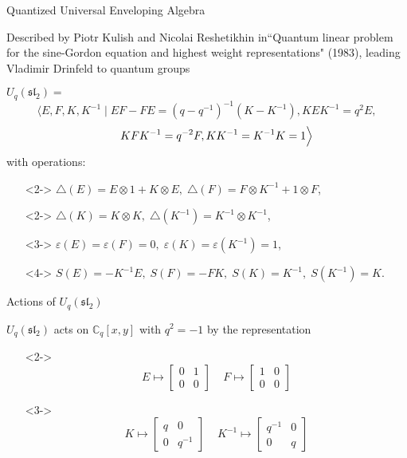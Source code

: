 \documentclass{beamer}
\begin{document}
\begin{frame}{Quantized Universal Enveloping Algebra}

Described by Piotr Kulish and Nicolai Reshetikhin in``Quantum linear problem for the sine-Gordon equation and highest weight representations" (1983), leading Vladimir Drinfeld to quantum groups\newline

$U_q(\mathfrak{sl}
_2)=$
\[
\Big\langle E,F,K,K^{-1}\;\vert\;EF-FE=(q-q^{-1})^{-1}\left(K-K^{-1}\right), KEK^{-1}=q^2 E, \]\[\hspace{4ex}KFK^{-1}=q^{-2}F, KK^{-1}=K^{-1}K=1\Big\rangle
\]
with operations:
\vspace{0.5ex}
\begin{itemize}
\setlength{\itemsep}{1.5ex}
    \item[]<2-> $\triangle(E)=E\otimes 1+K\otimes E,\; \triangle(F)=F\otimes K^{-1}+ 1\otimes F$, \item[]<2-> $\triangle(K)=K\otimes K,\; \triangle(K^{-1})=K^{-1}\otimes K^{-1}$,
    \item[]<3-> $\varepsilon(E)=\varepsilon(F)=0,\; \varepsilon(K)=\varepsilon(K^{-1})=1$,
    \item[]<4-> $S(E)=-K^{-1}E,\; S(F)=-F K, \;S(K)=K^{-1},\; S(K^{-1})=K$.
\end{itemize}

\end{frame}

\begin{frame}{Actions of $U_q(\mathfrak{sl}_2)$}

$U_q(\mathfrak{sl}_2)$ acts on $\mathbb{C}_q[x,y]$ with $q^2=-1$ by the representation
\begin{itemize}
\item[]<2->\[
E\mapsto \begin{bmatrix} 0&1\\0&0\end{bmatrix}\;\;\;\; F\mapsto \begin{bmatrix} 1&0\\0&0\end{bmatrix}
\]
\item[]<3->\[
K\mapsto\begin{bmatrix}q&0\\0&q^{-1}\end{bmatrix} \;\;\;\; K^{-1}\mapsto \begin{bmatrix}q^{-1}&0\\0&q\end{bmatrix}
\]
\end{itemize}

\end{frame}
\end{document}
